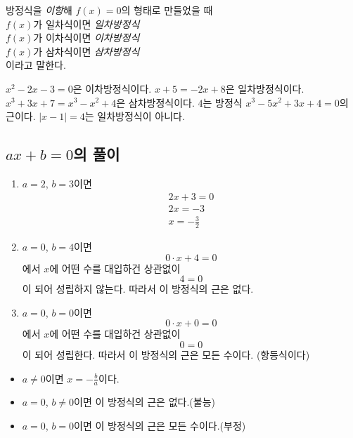 \documentclass{oblivoir}
\begin{document}
\begin{mdframed}
%
방정식을 \emph{이항}해 \(f(x)=0\)의 형태로 만들었을 때\\
\(f(x)\)가 일차식이면 \emph{일차방정식}\\
\(f(x)\)가 이차식이면 \emph{이차방정식}\\
\(f(x)\)가 삼차식이면 \emph{삼차방정식}\\
이라고 말한다.
\end{mdframed}


%
\label{line1}
\vspace{-20pt}
\tabd
{\(x^2-2x-3=0\)은 이차방정식이다.}
{\(x+5=-2x+8\)은 일차방정식이다.}
{\(x^3+3x+7=x^3-x^2+4\)은 삼차방정식이다.}
{\(4\)는 방정식 \(x^3-5x^2+3x+4=0\)의 근이다.}
{\(|x-1|=4\)는 일차방정식이 아니다.}

\clearpage
\subsection{\(ax+b=0\)의 풀이}
%
\exam{}
\begin{enumerate}
\item
\(a=2\), \(b=3\)이면
\begin{gather*}
2x+3=0\\
2x=-3\\
x=-\frac32
\end{gather*}
\item
\(a=0\), \(b=4\)이면
\[0\cdot x+4=0\]
에서 \(x\)에 어떤 수를 대입하건 상관없이 \[4=0\]이 되어 성립하지 않는다.
따라서 이 방정식의 근은 없다.
\item
\(a=0\), \(b=0\)이면
\[0\cdot x+0=0\]
에서 \(x\)에 어떤 수를 대입하건 상관없이 \[0=0\]이 되어 성립한다.
따라서 이 방정식의 근은 모든 수이다.
(항등식이다)
\end{enumerate}

\begin{mdframed}
%
\begin{itemize}
\item
\(a\neq0\)이면 \(x=-\frac ba\)이다.
\item
\(a=0\), \(b\neq0\)이면 이 방정식의 근은 없다.(불능)
\item
\(a=0\), \(b=0\)이면 이 방정식의 근은 모든 수이다.(부정)
\end{itemize}
\end{mdframed}
\end{document}
